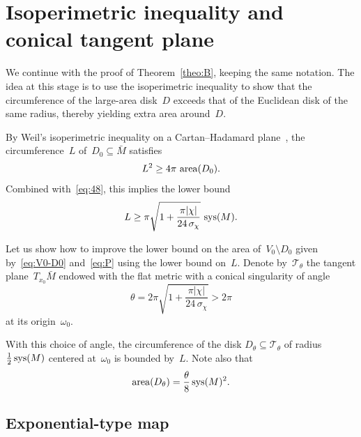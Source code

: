 \documentclass[12pt,reqno]{amsart}
\theoremstyle{definition}
\numberwithin{equation}{section}
\DeclareMathOperator{\area}{{\rm area}}
\DeclareMathOperator{\sys}{{\rm sys}}
\numberwithin{equation}{section}
\begin{document}

\section{Isoperimetric inequality and conical tangent plane}
\label{s4}



We continue with the proof of Theorem~\ref{theo:B}, keeping the same
notation.  The idea at this stage is to use the isoperimetric
inequality to show that the circumference of the large-area disk~$D$
exceeds that of the Euclidean disk of the same radius, thereby
yielding extra area around~$D$.

\medskip

By Weil's isoperimetric inequality on a Cartan--Hadamard plane~\cite[Theorem~2.3]{rit23}, the circumference~$L$ of~$D_0 \subseteq \bar{M}$ satisfies 
\[
L^2 \geq 4\pi \, \area(D_0).
\]
Combined with~\eqref{eq:48}, this implies the lower bound
\[
L \geq \pi \sqrt{1+\frac{\pi |\chi|}{24 \, \sigma_\chi}} \, \sys(M).
\]

Let us show how to improve the lower bound on the area of~$V_0 \setminus D_0$ given by~\eqref{eq:V0-D0} and~\eqref{eq:P} using the lower bound on~$L$.
Denote by~$\mathcal{T}_\theta$ the tangent plane~$T_{x_0} \bar{M}$ endowed with the flat metric with a conical singularity of angle
\begin{equation} \label{eq:theta}
\theta = 2 \pi \sqrt{1+\frac{\pi |\chi|}{24 \, \sigma_\chi}} > 2\pi
\end{equation}
at its origin~$\omega_0$.

With this choice of angle, the circumference of the disk $D_\theta \subseteq \mathcal{T}_\theta$ of radius~$\frac{1}{2} \sys(M)$ centered at~$\omega_0$ is bounded by~$L$.
Note also that
\begin{equation} \label{eq:D_theta}
\area(D_\theta) = \frac{\theta}{8} \sys(M)^2. %
\end{equation}


\subsection{Exponential-type map}
\end{document}
